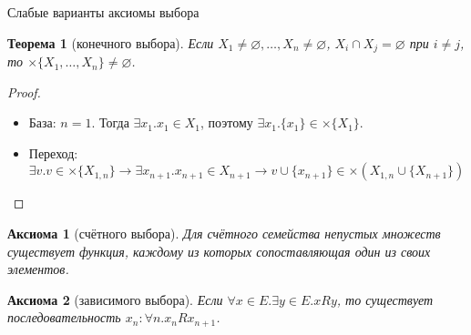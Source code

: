 \documentclass[aspectratio=169]{beamer}
\newtheorem{axm}{Аксиома}[section]
\newtheorem{thm}{Теорема}[section]
\begin{document}
\begin{frame}{Слабые варианты аксиомы выбора}

\begin{thm}[конечного выбора]
Если $X_1\ne\varnothing, \dots, X_n\ne\varnothing$, $X_i\cap X_j = \varnothing$ при $i \ne j$, то $\times \{X_1, \dots, X_n\} \ne \varnothing$.
\end{thm}

\begin{proof}
\begin{itemize}\item База: $n=1$. Тогда $\exists x_1.x_1 \in X_1$, поэтому $\exists x_1.\{x_1\} \in \times \{X_1\}$.

\item Переход: %
$\exists v.v \in \times \{X_{1,n}\}\rightarrow\exists x_{n+1}.x_{n+1} \in X_{n+1}\rightarrow
v \cup \{x_{n+1}\} \in \times (X_{1,n}\cup\{X_{n+1}\})$
\end{itemize}\vspace{-0.3cm}\end{proof}




\begin{axm}[счётного выбора]
Для счётного семейства непустых множеств существует функция, каждому из которых сопоставляющая один из своих элементов.
\end{axm}

\begin{axm}[зависимого выбора]
Если $\forall x \in E.\exists y \in E. x R y$, то существует последовательность $x_n: \forall n.x_n R x_{n+1}$.
\end{axm}
\end{frame}
\end{document}
